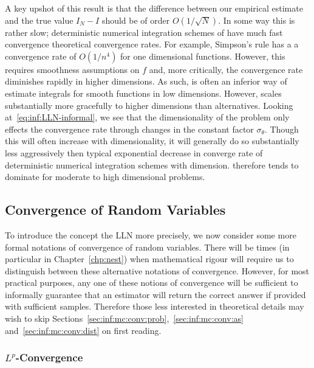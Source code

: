 A key upshot of this result is that the difference between our empirical estimate and the true value
$I_N-I$ should be of order $O(1/\sqrt{N})$.  In some way this is rather slow; deterministic numerical
integration schemes of have much fast convergence theoretical convergence rates.  For example,
Simpson's rule has a a convergence rate of $O(1/n^4)$ for one dimensional functions.  However, this
requires smoothness assumptions on $f$ and, more critically, the convergence rate diminishes rapidly
in higher dimensions.  As such, \mc is often an inferior way of estimate integrals for smooth functions
in low dimensions.  However, \mc scales substantially more gracefully to higher dimensions than
alternatives.  Looking at~\eqref{eq:inf:LLN-informal}, we see that the dimensionality of the problem
only effects the \mc convergence rate through changes in the constant factor $\sigma_{\theta}$.  Though
this will often increase with dimensionality, it will generally do so substantially less aggressively
then typical exponential decrease in converge rate of deterministic numerical integration schemes
with dimension.  \mc therefore tends to dominate for moderate to high dimensional problems.

\subsection{Convergence of Random Variables}
\label{sec:inf:mc:conv}

To introduce the concept the LLN more precisely, we now consider some more formal notations
of convergence of random variables.  There will be times (in particular in Chapter~\ref{chp:nest})
when mathematical rigour will require us to distinguish between these alternative notations of convergence.
However, for most practical purposes, any one of these notions of convergence will be sufficient 
to informally guarantee that an estimator will return the correct answer if provided 
with sufficient samples.  Therefore those less interested in theoretical details may wish to
skip Sections~\ref{sec:inf:mc:conv:prob},~\ref{sec:inf:mc:conv:as} and~\ref{sec:inf:mc:conv:dist}
on first reading.

\subsubsection{$L^p$-Convergence}
\label{sec:inf:mc:conv:Lr}

